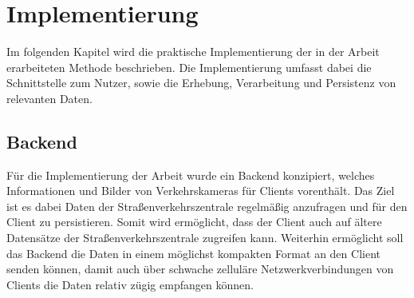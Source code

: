 \chapter{Implementierung}
Im folgenden Kapitel wird die praktische Implementierung der in der Arbeit erarbeiteten Methode beschrieben. Die Implementierung umfasst dabei die Schnittstelle zum Nutzer, sowie die Erhebung, Verarbeitung und Persistenz von relevanten Daten.
\section{Backend}
Für die Implementierung der Arbeit wurde ein Backend konzipiert, welches Informationen und Bilder von Verkehrskameras für Clients vorenthält. Das Ziel ist es dabei Daten der Straßenverkehrszentrale regelmäßig anzufragen und für den Client zu persistieren. Somit wird ermöglicht, dass der Client auch auf ältere Datensätze der Straßenverkehrszentrale zugreifen kann. Weiterhin ermöglicht soll das Backend die Daten in einem möglichst kompakten Format an den Client senden können, damit auch über schwache zelluläre Netzwerkverbindungen von Clients die Daten relativ zügig empfangen können. 

